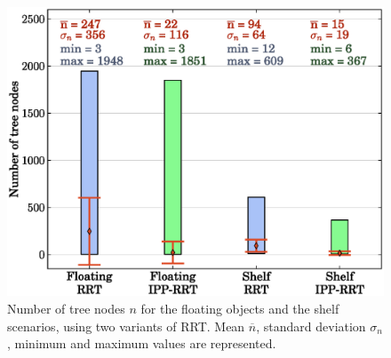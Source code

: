 \begin{figure}
\centering
\includegraphics[width=0.7\linewidth]
                {src/appendix/plots/rrt-n.eps}
\caption{Number of tree nodes $n$ for the floating objects and the
  shelf scenarios, using two variants of RRT. Mean $\overline{n}$,
  standard deviation $\sigma_{n}$, minimum and maximum values are
  represented.}
\label{fig:rrt-n}
\end{figure}
